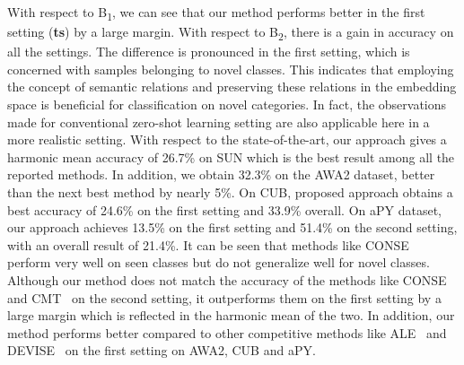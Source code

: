 \documentclass[10pt,twocolumn,letterpaper]{article}
\begin{document}
With respect to B\textsubscript{1}, we can see that our method performs better in the first setting (\textbf{ts}) by a large margin. With respect to B\textsubscript{2}, there is a gain in accuracy on all the settings. The difference is pronounced in the first setting, which is concerned with samples belonging to novel classes. This indicates that employing the concept of semantic relations and preserving these relations in the embedding space is beneficial for classification on novel categories. In fact, the observations made for conventional zero-shot learning setting are also applicable here in a more realistic setting. With respect to the state-of-the-art, our approach gives a harmonic mean accuracy of 26.7\%  on SUN which is the best result among all the reported methods. %
In addition, we obtain 32.3\% on the AWA2 dataset, better than the next best method by nearly 5\%. On CUB, proposed approach obtains a best accuracy of 24.6\% on the first setting and 33.9\% overall. On aPY dataset, our approach achieves 13.5\% on the first setting and 51.4\% on the second setting, with an overall result of 21.4\%. It can be seen that methods like CONSE~\cite{norouzi2013zero} perform very well on seen classes but do not generalize well for novel classes. Although our method does not match the accuracy of the methods like CONSE~\cite{norouzi2013zero} and CMT~\cite{socher2013zero} on the second setting, it outperforms them on the first setting by a large margin which is reflected in the harmonic mean of the two. In addition, our method performs better compared to other competitive methods like ALE~\cite{akata2016label} and DEVISE~\cite{frome2013devise} on the first setting on AWA2, CUB and aPY. %
\end{document}
